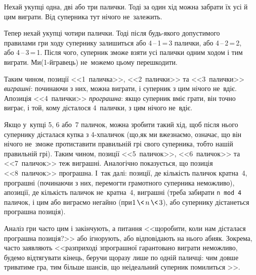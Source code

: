 \Tutorial
Нехай у\nolinebreak[3] купці одна, дві або три палички. Тоді за один хід можна забрати їх усі й цим виграти. Від суперника тут нічого не~залежить.

Тепер нехай у\nolinebreak[3] купці чотири палички. Тоді 
після будь-якого допустимого правилами гри ходу супернику залишиться 
або \mbox{4$\,$--$\,$1$\,$=$\,$3} палички,
або \mbox{4$\,$--$\,$2$\,$=$\,$2},
або \mbox{4$\,$--$\,$3$\,$=$\,$1}.
Після чого, суперник зможе взяти усі палички одним ходом і тим виграти. Ми\nolinebreak[3] (\mbox{1-й}\nolinebreak[3] гравець) %
не~можемо цьому перешкодити.

Таким чином, позиції 
<<1~паличка>>,
<<2~палички>> та
<<3~палички>> \emph{виграшні}:
починаючи з них, можна виграти, і суперник з цим нічого не~вдіє.
А\nolinebreak[3] позиція <<4~палички>> \emph{програшна}:
якщо суперник вміє грати, він точно виграє, і той, кому дісталося 4~палички, з цим нічого не~вдіє.

Якщо у~купці 5, 6 або~7 паличок, можна зробити такий хід, щоб після нього супернику дісталася купка з \mbox{4-х}\nolinebreak[2] паличок (що,\nolinebreak[3] як ми вже\nolinebreak[2] знаємо, означає, що він нічого не~зможе протиставити правильній грі свого суперника, тобто нашій правильній грі). Таким чином, позиції
<<5~паличок>>,
<<6~паличок>> та
<<7~паличок>> теж виграшні. 
Аналогічно показується, що позиція <<8~паличок>> програшна.
І~так далі: позиції, де кількість паличок кратна~4, програшні (починаючи з них, перемогти грамотного суперника неможливо), а\nolinebreak[3] позиції, де кількість паличок не~кратна~4, виграшні (треба забирати \texttt{n~mod~4} паличок, і цим або виграємо негайно (при\nolinebreak[2] ${1\,{\<}\,n\,{\<}\,3}$), або супернику дістанеться програшна позиція).

Аналіз %
гри часто цим і закінчують, а питання <<що\nolinebreak[2] робити, коли нам дісталася програшна позиція?>> або %
ігнорують, або відповідають на нього абияк. Зокрема, часто 
заявляють
<<раз\nolinebreak[2] при\nolinebreak[2] ході з\nolinebreak[2] програшної гарантовано виграти %
неможливо, будемо відтягувати кінець, беручи щоразу лише по одній паличці: чим довше триватиме гра, тим більше шансів, що неідеальний суперник 
помилиться%
>>.

